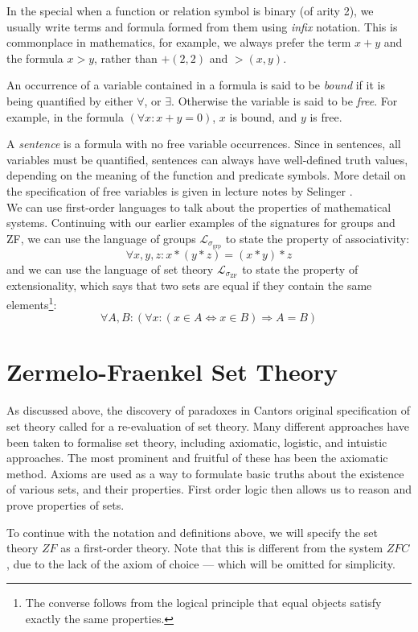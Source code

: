 \documentclass[11pt]{report}
\theoremstyle{definition}
\theoremstyle{theorem}
\theoremstyle{lemma}
\begin{document}
In the special when a function or relation symbol is binary (of arity 2), we usually write terms and formula formed from them using \emph{infix} notation.
This is commonplace in mathematics, for example, we always prefer the term $x+y$ and the formula $x>y$, rather than $+(2,2)$ and $>(x,y)$.

An occurrence of a variable contained in a formula is said to be \emph{bound} if it is being quantified by either $\forall$, or $\exists$.
Otherwise the variable is said to be \emph{free}. For example, in the formula $(\forall x: x+y=0)$, $x$ is bound, and $y$ is free.

A \emph{sentence} is a formula with no free variable occurrences.
Since in sentences, all variables must be quantified, sentences can always have well-defined truth values, depending on the meaning of the function and predicate symbols.
More detail on the specification of free variables is given in lecture notes by Selinger \cite[ch.~1.9]{selinger}.\\

\noindent
We can use first-order languages to talk about the properties of mathematical systems.
Continuing with our earlier examples of the signatures for groups and ZF, we can use the language of groups $\mathcal{L}_{\sigma_{\text{grp}}}$ to state the property of associativity:
$$\forall x,y,z: x*(y*z) = (x*y)*z$$
and we can use the language of set theory $\mathcal{L}_{\sigma_{\text{ZF}}}$ to state the property of extensionality, which says that two sets are equal if they contain the same elements\footnote{The converse follows from the logical principle that equal objects satisfy exactly the same properties.}:
$$\forall A,B: (\forall x:(x\in A \Leftrightarrow x\in B) \Rightarrow A = B)$$

\section{Zermelo-Fraenkel Set Theory}
As discussed above, the discovery of paradoxes in Cantors original specification of set theory called for a re-evaluation of set theory.
Many different approaches have been taken to formalise set theory, including axiomatic, logistic, and intuistic approaches.
The most prominent and fruitful of these has been the axiomatic method.
Axioms are used as a way to formulate basic truths about the existence of various sets, and their properties.
First order logic then allows us to reason and prove properties of sets.

To continue with the notation and definitions above, we will specify the set theory $\mathit{ZF}$ as a first-order theory.
Note that this is different from the system $\mathit{ZFC}$, due to the lack of the axiom of choice --- which will be omitted for simplicity.
\end{document}
